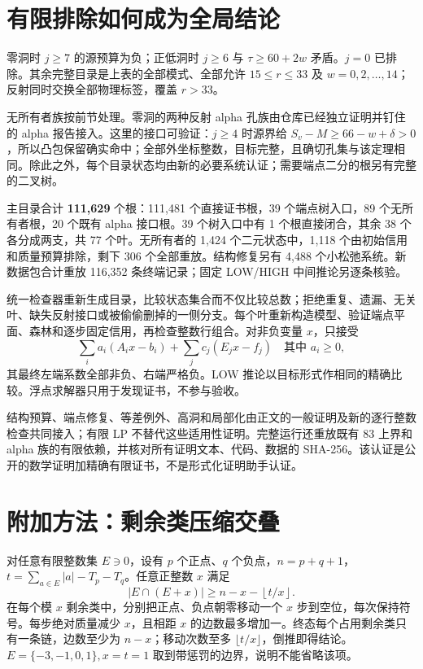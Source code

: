 \documentclass[11pt,a4paper]{article}
\begin{document}
\hypertarget{ux6709ux9650ux6392ux9664ux5982ux4f55ux6210ux4e3aux5168ux5c40ux7ed3ux8bba}{%
\section{有限排除如何成为全局结论}\label{ux6709ux9650ux6392ux9664ux5982ux4f55ux6210ux4e3aux5168ux5c40ux7ed3ux8bba}}

零洞时 \(j\ge7\) 的源预算为负；正低洞时 \(j\ge6\) 与 \(\tau\ge60+2w\)
矛盾。\(j=0\) 已排除。其余完整目录是上表的全部模式、全部允许
\(15\le r\le33\) 及 \(w=0,2,\ldots,14\)；反射同时交换全部物理标签，覆盖
\(r>33\)。

无所有者族按前节处理。零洞的两种反射 alpha
孔族由仓库已经独立证明并钉住的 alpha
报告接入。这里的接口可验证：\(j\ge4\) 时源界给
\(S_v-M\ge66-w+\delta>0\)，所以凸包保留确实命中；全部外坐标整数，目标完整，且确切孔集与该定理相同。除此之外，每个目录状态均由新的必要系统认证；需要端点二分的根另有完整的二叉树。

主目录合计 \textbf{111,629} 个根：111,481 个直接证书根，39
个端点树入口，89 个无所有者根，20 个既有 alpha 接口根。39 个树入口中有 1
个根直接闭合，其余 38 个各分成两支，共 77 个叶。无所有者的 1,424
个二元状态中，1,118 个由初始信用和质量预算排除，剩下 306
个全部重放。结构修复另有 4,488 个小松弛系统。新数据包合计重放 116,352
条终端记录；固定 LOW/HIGH 中间推论另逐条核验。

统一检查器重新生成目录，比较状态集合而不仅比较总数；拒绝重复、遗漏、无关叶、缺失反射接口或被偷偷删掉的一侧分支。每个叶重新构造模型、验证端点平面、森林和逐步固定信用，再检查整数行组合。对非负变量
\(x\)，只接受 \[
 \sum_i a_i(A_ix-b_i)+\sum_j c_j(E_jx-f_j)
 \quad\text{其中 }a_i\ge0,
\] 其最终左端系数全部非负、右端严格负。LOW
推论以目标形式作相同的精确比较。浮点求解器只用于发现证书，不参与验收。

结构预算、端点修复、等差例外、高洞和局部化由正文的一般证明及新的逐行整数检查共同接入；有限
LP 不替代这些适用性证明。完整运行还重放既有 83 上界和 alpha
族的有限依赖，并核对所有证明文本、代码、数据的
SHA-256。该认证是公开的数学证明加精确有限证书，不是形式化证明助手认证。

\hypertarget{ux9644ux52a0ux65b9ux6cd5ux5269ux4f59ux7c7bux538bux7f29ux4ea4ux53e0}{%
\section{附加方法：剩余类压缩交叠}\label{ux9644ux52a0ux65b9ux6cd5ux5269ux4f59ux7c7bux538bux7f29ux4ea4ux53e0}}

对任意有限整数集 \(E\ni0\)，设有 \(p\) 个正点、\(q\)
个负点，\(n=p+q+1\)，\(t=\sum_{a\in E}|a|-T_p-T_q\)。任意正整数 \(x\)
满足 \[
 |E\cap(E+x)|\ge n-x-\left\lfloor t/x\right\rfloor.
\] 在每个模 \(x\) 剩余类中，分别把正点、负点朝零移动一个 \(x\)
步到空位，每次保持符号。每步绝对质量减少 \(x\)，且相距 \(x\)
的边数最多增加一。终态每个占用剩余类只有一条链，边数至少为
\(n-x\)；移动次数至多
\(\lfloor t/x\rfloor\)，倒推即得结论。\(E=\{-3,-1,0,1\},x=t=1\)
取到带惩罚的边界，说明不能省略该项。
\end{document}
